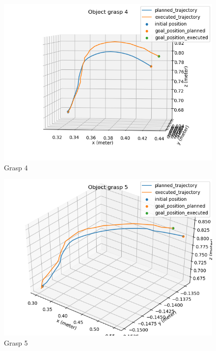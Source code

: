 \begin{figure}[H]
	\centering
	\includegraphics[scale=0.7]{images/HSR_4/4.png}
	\caption{Grasp 4}
	\label{fig:grasp_4}
\end{figure}

\begin{figure}[H]
	\centering
	\includegraphics[scale=0.7]{images/HSR_4/5.png}
	\caption{Grasp 5}
	\label{fig:grasp_5}
\end{figure}


